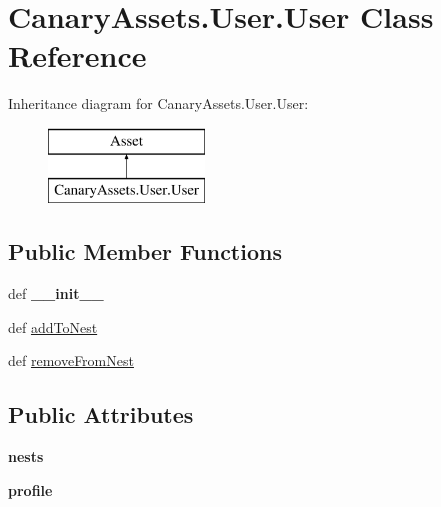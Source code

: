 \hypertarget{class_canary_assets_1_1_user_1_1_user}{\section{Canary\-Assets.\-User.\-User Class Reference}
\label{class_canary_assets_1_1_user_1_1_user}
}
Inheritance diagram for Canary\-Assets.\-User.\-User\-:\begin{figure}[H]
\begin{center}
\leavevmode
\includegraphics[height=2.000000cm]{class_canary_assets_1_1_user_1_1_user}
\end{center}
\end{figure}
\subsection*{Public Member Functions}
\begin{DoxyCompactItemize}
\item 
\hypertarget{class_canary_assets_1_1_user_1_1_user_af4ad306fd8dc77414541b293416f698c}{def {\bfseries \-\_\-\-\_\-init\-\_\-\-\_\-}}\label{class_canary_assets_1_1_user_1_1_user_af4ad306fd8dc77414541b293416f698c}

\item 
def \hyperlink{class_canary_assets_1_1_user_1_1_user_a1a73be79bd9c9360c51059ce7eaf2878}{add\-To\-Nest}
\item 
def \hyperlink{class_canary_assets_1_1_user_1_1_user_afa43d2b1b97ee68a8361c9e069eea374}{remove\-From\-Nest}
\end{DoxyCompactItemize}
\subsection*{Public Attributes}
\begin{DoxyCompactItemize}
\item 
\hypertarget{class_canary_assets_1_1_user_1_1_user_a488d6c32bf529e8a067285ce019aeca3}{{\bfseries nests}}\label{class_canary_assets_1_1_user_1_1_user_a488d6c32bf529e8a067285ce019aeca3}

\item 
\hypertarget{class_canary_assets_1_1_user_1_1_user_aed46930dc8a289ee349226c7dc9e74c6}{{\bfseries profile}}\label{class_canary_assets_1_1_user_1_1_user_aed46930dc8a289ee349226c7dc9e74c6}

\end{DoxyCompactItemize}


